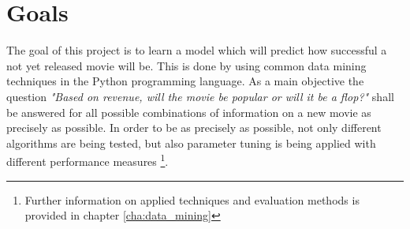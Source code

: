 \section{Goals}
The goal of this project is to learn a model which will predict how successful a not yet released movie will be. This is done by using common data mining techniques in the Python programming language. As a main objective the question \textit{"Based on revenue, will the movie be popular or will it be a flop?"} shall be answered for all possible combinations of information on a new movie as precisely as possible.
In order to be as precisely as possible, not only different algorithms are being tested, but also parameter tuning is being applied with different performance measures \footnote{Further information on applied techniques and evaluation methods is provided in chapter \ref{cha:data_mining}}.








